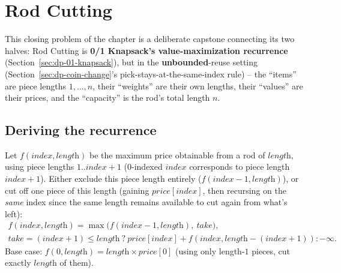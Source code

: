 \section{Rod Cutting}
\label{sec:dp-rod-cutting}


\begin{patternbox}
This closing problem of the chapter is a deliberate capstone connecting
its two halves: Rod Cutting is \textbf{0/1 Knapsack's value-maximization
recurrence} (Section~\ref{sec:dp-01-knapsack}), but in the
\textbf{unbounded}-reuse setting (Section~\ref{sec:dp-coin-change}'s
pick-stays-at-the-same-index rule) -- the ``items'' are piece lengths
$1, \ldots, n$, their ``weights'' are their own lengths, their
``values'' are their prices, and the ``capacity'' is the rod's total
length $n$.
\end{patternbox}

\subsection*{Deriving the recurrence}

Let $f(\textit{index}, \textit{length})$ be the maximum price obtainable
from a rod of $\textit{length}$, using piece lengths $1..\textit{index}+1$
(0-indexed $\textit{index}$ corresponds to piece length
$\textit{index}+1$). Either exclude this piece length entirely
($f(\textit{index}-1, \textit{length})$), or cut off one piece of this
length (gaining $\textit{price}[\textit{index}]$, then recursing on the
\emph{same} index since the same length remains available to cut again
from what's left):
\begin{gather*}
  f(\textit{index}, \textit{length}) = \max\Big(
  f(\textit{index}{-}1, \textit{length}),\ \textit{take} \Big), \\
  \textit{take} = (\textit{index}{+}1) \le \textit{length}\ ?\
  \textit{price}[\textit{index}] + f(\textit{index}, \textit{length}-(\textit{index}{+}1))
  : -\infty.
\end{gather*}
Base case: $f(0, \textit{length}) = \textit{length} \times
\textit{price}[0]$ (using only length-$1$ pieces, cut exactly
$\textit{length}$ of them).

